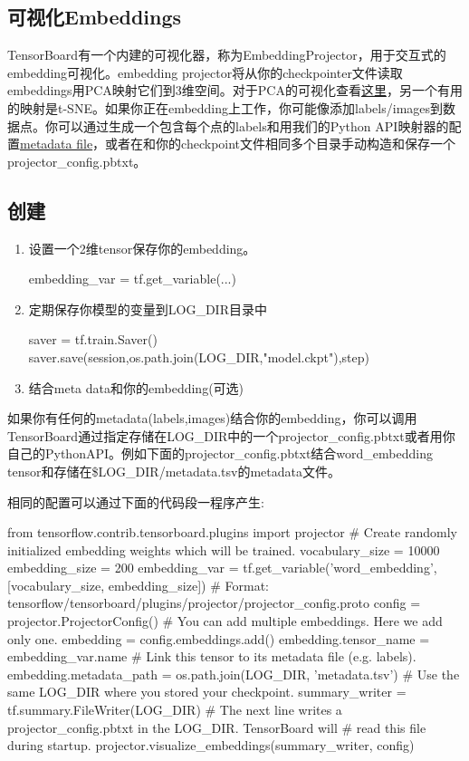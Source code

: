 \subsection{可视化Embeddings}
TensorBoard有一个内建的可视化器，称为EmbeddingProjector，用于交互式的embedding可视化。embedding projector将从你的checkpointer文件读取embeddings用PCA映射它们到3维空间。对于PCA的可视化查看\href{http://setosa.io/ev/principal-component-analysis/}{这里}，另一个有用的映射是t-SNE。如果你正在embedding上工作，你可能像添加labels/images到数据点。你可以通过生成一个包含每个点的labels和用我们的Python API映射器的配置\href{https://www.tensorflow.org/programmers_guide/embedding#metadata}{metadata file}，或者在和你的checkpoint文件相同多个目录手动构造和保存一个projector\_config.pbtxt。
\subsection{创建}
\begin{enumerate}
	\item 设置一个2维tensor保存你的embedding。
		\begin{python}
			embedding_var = tf.get_variable(...)
		\end{python}
	\item 定期保存你模型的变量到LOG\_DIR目录中
		\begin{python}
			saver = tf.train.Saver()
			saver.save(session,os.path.join(LOG_DIR,"model.ckpt"),step)
		\end{python}
	\item 结合meta data和你的embedding(可选)
\end{enumerate}
如果你有任何的metadata(labels,images)结合你的embedding，你可以调用TensorBoard通过指定存储在LOG\_DIR中的一个projector\_config.pbtxt或者用你自己的PythonAPI。例如下面的projector\_config.pbtxt结合word\_embedding tensor和存储在\$LOG\_DIR/metadata.tsv的metadata文件。
相同的配置可以通过下面的代码段一程序产生:
\begin{python}
from tensorflow.contrib.tensorboard.plugins import projector
# Create randomly initialized embedding weights which will be trained.
vocabulary_size = 10000
embedding_size = 200
embedding_var = tf.get_variable('word_embedding', [vocabulary_size, embedding_size])
# Format: tensorflow/tensorboard/plugins/projector/projector_config.proto
config = projector.ProjectorConfig()
# You can add multiple embeddings. Here we add only one.
embedding = config.embeddings.add()
embedding.tensor_name = embedding_var.name
# Link this tensor to its metadata file (e.g. labels).
embedding.metadata_path = os.path.join(LOG_DIR, 'metadata.tsv')
# Use the same LOG_DIR where you stored your checkpoint.
summary_writer = tf.summary.FileWriter(LOG_DIR)
# The next line writes a projector_config.pbtxt in the LOG_DIR. TensorBoard will
# read this file during startup.
projector.visualize_embeddings(summary_writer, config)
\end{python}
